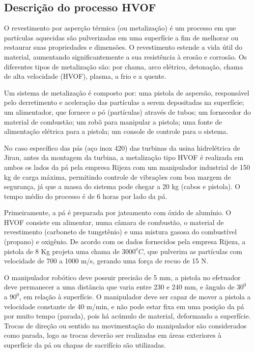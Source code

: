 \subsection{Descrição do processo HVOF}
O revestimento por asperção térmica (ou metalização) é um processo em que
partículas aquecidas são pulverizadas em uma superfície a fim de melhorar ou
restaurar suas propriedades e dimensões. O revestimento estende a vida útil do
material, aumentando significantemente a sua resistência à erosão e corrosão.
Os diferentes tipos de metalização são: por chama, arco elétrico, detonação,
chama de alta velocidade (HVOF), plasma, a frio e a quente.

Um sistema de metalização é composto por: uma pistola de aspersão, responsável
pelo derretimento e aceleração das partículas a serem depositadas na
superfície; um alimentador, que fornece o pó (partículas) através de tubos;
um fornecedor do material de combustão; um robô para manipular a pistola; uma
fonte de alimentação elétrica para a pistola; um console de controle para o
sistema.

No caso específico das pás (aço inox 420) das turbinas da usina hidrelétrica de
Jirau, antes da montagem da turbina, a metalização tipo HVOF é realizada em
ambos os lados da pá pela empresa Rijeza com um manipulador industrial de 150 kg
de carga máxima, permitindo controle de vibrações com boa margem de segurança, já que a massa do
sistema pode chegar a 20 kg (cabos e pistola). O tempo
médio do processo é de 6 horas por lado da pá.

Primeiramente, a pá é preparada por jateamento com óxido de alumínio. O HVOF
consiste em alimentar, numa câmara de combustão, o material de revestimento
(carboneto de tungstênio) e uma mistura gasosa do combustível (propano) e
oxigênio. De acordo com os dados fornecidos pela empresa Rijeza, a pistola de 8
Kg projeta uma chama de $3000^oC$, que pulveriza as partículas com velocidade de
700 a 1000 m/s, gerando uma força de recuo de 15 N.

O manipulador robótico deve possuir precisão de 5 mm, a pistola no
efetuador deve permanecer a uma distância que varia entre 230 e 240 mm, e ângulo
de $30^0$ a $90^0$, em relação à superfície. O manipulador deve ser capaz
de mover a pistola a velocidade constante de 40 m/min, e não pode estar
fixa em uma posição da pá por muito tempo (parada), pois há acúmulo de
material, deformando a superfície. Trocas de direção ou sentido na movimentação
do manipulador são considerados como parada, logo as trocas deverão ser
realizadas em áreas exteriores à superfície da pá ou chapas de sacrifício são
utilizadas. %
 
